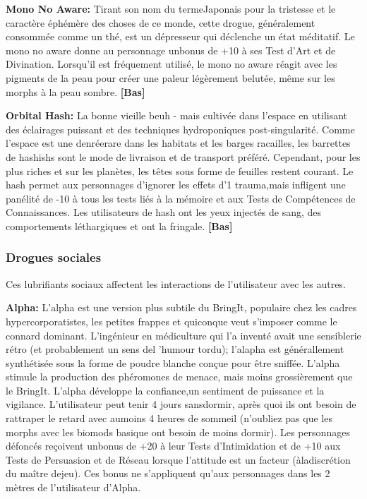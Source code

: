 \textbf{Mono No Aware:} Tirant son nom du termeJaponais pour la tristesse et le caractère éphémère des choses de ce monde, cette drogue, généralement consommée comme un thé, est un dépresseur qui déclenche un état méditatif. Le mono no aware donne au personnage unbonus de +10 à ses Test d'Art et de Divination. Lorsqu'il est fréquement utilisé, le mono no aware réagit avec les pigments de la peau pour créer une paleur légèrement belutée, même sur les morphs à la peau sombre. \textbf{[Bas]} 

\textbf{Orbital Hash:} La bonne vieille beuh - mais cultivée dans l'espace en utilisant des éclairages puissant et des techniques hydroponiques post-singularité. Comme l'espace est une denréerare dans les habitats et les barges racailles, les barrettes de hashishs sont le mode de livraison et de transport préféré. Cependant, pour les plus riches et sur les planètes, les têtes sous forme de feuilles restent courant. Le hash permet aux personnages d'ignorer les effets d'1 trauma,mais infligent une panélité de -10 à tous les tests liés à la mémoire et aux Tests de Compétences de Connaissances. Les utilisateurs de hash ont les yeux injectés de sang, des comportements léthargiques et ont la fringale. \textbf{[Bas]}\subsubsection{Drogues sociales} Ces lubrifiants sociaux affectent les interactions de l'utilisateur avec les autres. 

\textbf{Alpha:} L'alpha est une version plus subtile du BringIt, populaire chez les cadres hypercorporatistes, les petites frappes et quiconque veut s'imposer comme le connard dominant. L'ingénieur en médiculture qui l'a inventé avait une sensiblerie rétro (et probablement un sens del 'humour tordu); l'alapha est générallement synthétisée sous la forme de poudre blanche conçue pour être sniffée.  L'alpha stimule la production des phéromones de menace, mais moins grossièrement que le BringIt. L'alpha développe la confiance,un sentiment de puissance et la vigilance. L'utilisateur peut tenir 4 jours sansdormir, après quoi ils ont besoin de rattraper le retard avec aumoins 4 heures  de sommeil (n'oubliez pas que les morphs avec les biomods basique ont besoin de moins dormir). Les personnages défoncés reçoivent unbonus de +20 à leur Tests d'Intimidation et de +10 aux Tests de Persuasion et de Réseau lorsque l'attitude est un facteur (àladiscrétion du maître dejeu). Ces bonus ne s'appliquent qu'aux personnages dans les 2 mètres de l'utilisateur d'Alpha. 

